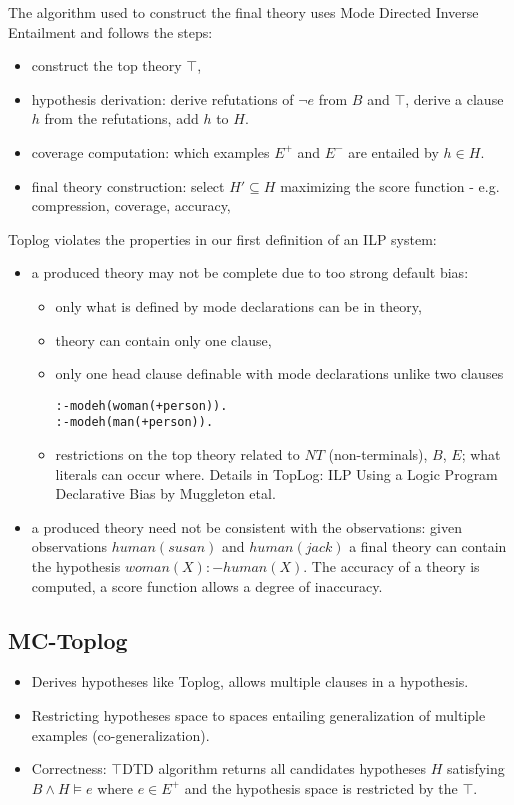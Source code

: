 The algorithm used to construct the final theory uses Mode Directed Inverse Entailment and follows the steps:
\begin{itemize}
\item construct the top theory $\top$,
\item hypothesis derivation: derive refutations of $\neg e$ from $B$ and $\top$, derive a clause $h$ from the refutations, add $h$ to $H$.
\item coverage computation: which examples $E^+$ and $E^-$ are entailed by $h \in H$.
\item final theory construction: select $H' \subseteq H$ maximizing the score function - e.g. compression, coverage, accuracy,
\end{itemize}
Toplog violates the properties in our first definition of an ILP system:
\begin{itemize}
\item a produced theory may not be complete due to too strong default bias:
\begin{itemize}
\item only what is defined by mode declarations can be in theory,
\item theory can contain only one clause,
\item only one head clause definable with mode declarations unlike two clauses
\begin{lstlisting}
:-modeh(woman(+person)).
:-modeh(man(+person)).
\end{lstlisting}

\item restrictions on the top theory related to $NT$ (non-terminals), $B$, $E$; what literals can occur where. Details in TopLog: ILP Using a Logic Program Declarative Bias by Muggleton etal.
\end{itemize}
\item a produced theory need not be consistent with the observations: given observations $human(susan)$ and $human(jack)$ a final theory can contain the hypothesis $woman(X) :- human(X)$. The accuracy of a theory is computed, a score function allows a degree of inaccuracy.
\end{itemize}

\subsection{MC-Toplog}
\begin{itemize}
\item Derives hypotheses like Toplog, allows multiple clauses in a hypothesis.
\item Restricting hypotheses space to spaces entailing generalization of multiple examples (co-generalization).
\item Correctness: $\top$DTD algorithm returns all candidates hypotheses $H$ satisfying $B \wedge H \models e$ where $e \in E^+$ and the hypothesis space is restricted by the $\top$.
\end{itemize}

